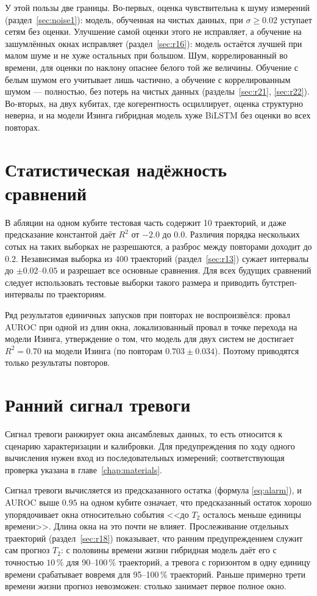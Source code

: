 \documentclass[12pt,a4paper]{report}
\numberwithin{equation}{chapter}
\begin{document}
У этой пользы две границы. Во-первых, оценка чувствительна к шуму
измерений (раздел~\ref{sec:noise1}): модель, обученная на чистых данных,
при $\sigma\ge0.02$ уступает сетям без оценки. Улучшение самой оценки этого
не исправляет, а обучение на зашумлённых окнах исправляет
(раздел~\ref{sec:r16}): модель остаётся лучшей при малом шуме и не хуже
остальных при большом. Шум, коррелированный во времени, для оценки по
наклону опаснее белого той же величины. Обучение с белым шумом его
учитывает лишь частично, а обучение с коррелированным шумом --- полностью,
без потерь на чистых данных (разделы~\ref{sec:r21}, \ref{sec:r22}). Во-вторых, на двух кубитах, где когерентность
осциллирует, оценка структурно неверна, и на модели Изинга гибридная модель
хуже BiLSTM без оценки во всех повторах.

\section{Статистическая надёжность сравнений}

В абляции на одном кубите тестовая часть содержит 10 траекторий, и даже
предсказание константой даёт $R^2$ от $-2.0$ до $0.0$. Различия порядка
нескольких сотых на таких выборках не разрешаются, а разброс между
повторами доходит до $0.2$. Независимая выборка из 400 траекторий
(раздел~\ref{sec:r13}) сужает интервалы до $\pm0.02$--$0.05$ и разрешает все
основные сравнения. Для всех будущих сравнений следует использовать
тестовые выборки такого размера и приводить бутстреп-интервалы по
траекториям.

Ряд результатов единичных запусков при повторах не воспроизвёлся:
провал AUROC при одной из длин окна, локализованный провал в точке
перехода на модели Изинга, утверждение о том, что модель для двух систем не
достигает $R^2=0.70$ на модели Изинга (по повторам $0.703\pm0.034$).
Поэтому приводятся только результаты повторов.

\section{Ранний сигнал тревоги}

Сигнал тревоги ранжирует окна ансамблевых данных, то есть относится к
сценарию характеризации и калибровки. Для предупреждения по ходу одного
вычисления нужен вход из последовательных измерений; соответствующая
проверка указана в главе~\ref{chap:materials}.

Сигнал тревоги вычисляется из предсказанного остатка (формула
\eqref{eq:alarm}), и AUROC выше $0.95$ на одном кубите означает, что
предсказанный остаток хорошо упорядочивает окна относительно события
<<до $T_2$ осталось меньше единицы времени>>. Длина окна на это почти не
влияет. Прослеживание отдельных траекторий (раздел~\ref{sec:r18})
показывает, что ранним предупреждением служит сам прогноз $T_2$: с
половины времени жизни гибридная модель даёт его с точностью $10\,\%$ для
90--100\,\% траекторий, а тревога с горизонтом в одну единицу времени
срабатывает вовремя для 95--100\,\% траекторий. Раньше примерно трети
времени жизни прогноз невозможен: столько занимает первое полное окно.
\end{document}
